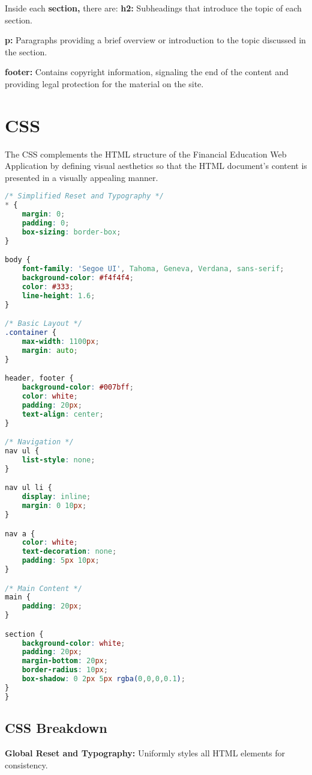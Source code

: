 \documentclass[10pt,twocolumn]{article}
\begin{document}
Inside each \textbf{section,} there are:
\textbf{h2: }Subheadings that introduce the topic of each section.

\textbf{p:} Paragraphs providing a brief overview or introduction to the topic discussed in the section.

\textbf{footer:} Contains copyright information, signaling the end of the content and providing legal protection for the material on the site.

\section{CSS}

The CSS complements the HTML structure of the Financial Education Web Application by defining visual aesthetics so that the HTML document's content is presented in a visually appealing manner. 

\begin{lstlisting}[language=CSS, caption={Simplified CSS for Website.HTML}, label=lst:csscode]
/* Simplified Reset and Typography */
* {
    margin: 0;
    padding: 0;
    box-sizing: border-box;
}

body {
    font-family: 'Segoe UI', Tahoma, Geneva, Verdana, sans-serif;
    background-color: #f4f4f4;
    color: #333;
    line-height: 1.6;
}

/* Basic Layout */
.container {
    max-width: 1100px;
    margin: auto;
}

header, footer {
    background-color: #007bff;
    color: white;
    padding: 20px;
    text-align: center;
}

/* Navigation */
nav ul {
    list-style: none;
}

nav ul li {
    display: inline;
    margin: 0 10px;
}

nav a {
    color: white;
    text-decoration: none;
    padding: 5px 10px;
}

/* Main Content */
main {
    padding: 20px;
}

section {
    background-color: white;
    padding: 20px;
    margin-bottom: 20px;
    border-radius: 10px;
    box-shadow: 0 2px 5px rgba(0,0,0,0.1);
}
}
\end{lstlisting}

\subsection{CSS Breakdown}

\textbf{Global Reset and Typography:} Uniformly styles all HTML elements for consistency.
\end{document}
